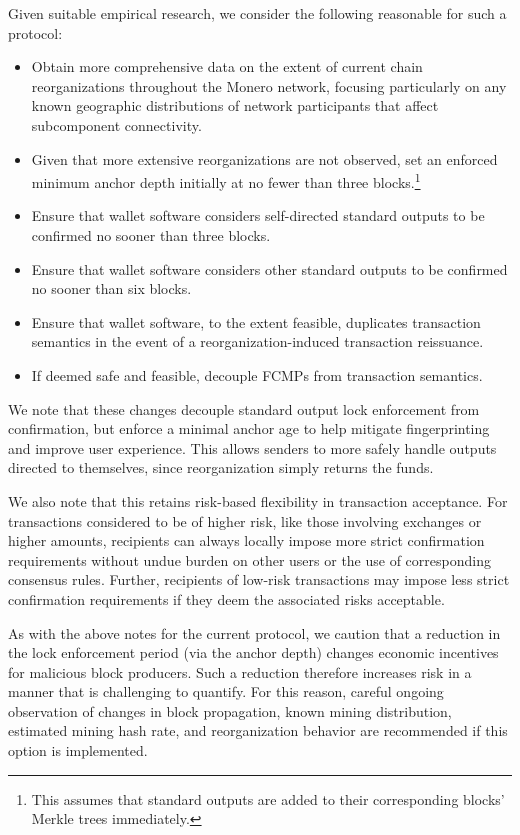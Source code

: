 \documentclass{article}
\theoremstyle{definition}
\begin{document}
Given suitable empirical research, we consider the following reasonable for such a protocol:
\begin{itemize}
\item Obtain more comprehensive data on the extent of current chain reorganizations throughout the Monero network, focusing particularly on any known geographic distributions of network participants that affect subcomponent connectivity.
\item Given that more extensive reorganizations are not observed, set an enforced minimum anchor depth initially at no fewer than three blocks.\footnote{This assumes that standard outputs are added to their corresponding blocks' Merkle trees immediately.}
\item Ensure that wallet software considers self-directed standard outputs to be confirmed no sooner than three blocks.
\item Ensure that wallet software considers other standard outputs to be confirmed no sooner than six blocks.
\item Ensure that wallet software, to the extent feasible, duplicates transaction semantics in the event of a reorganization-induced transaction reissuance.
\item If deemed safe and feasible, decouple FCMPs from transaction semantics.
\end{itemize}

We note that these changes decouple standard output lock enforcement from confirmation, but enforce a minimal anchor age to help mitigate fingerprinting and improve user experience.
This allows senders to more safely handle outputs directed to themselves, since reorganization simply returns the funds.

We also note that this retains risk-based flexibility in transaction acceptance.
For transactions considered to be of higher risk, like those involving exchanges or higher amounts, recipients can always locally impose more strict confirmation requirements without undue burden on other users or the use of corresponding consensus rules.
Further, recipients of low-risk transactions may impose less strict confirmation requirements if they deem the associated risks acceptable.

As with the above notes for the current protocol, we caution that a reduction in the lock enforcement period (via the anchor depth) changes economic incentives for malicious block producers.
Such a reduction therefore increases risk in a manner that is challenging to quantify.
For this reason, careful ongoing observation of changes in block propagation, known mining distribution, estimated mining hash rate, and reorganization behavior are recommended if this option is implemented. 
\end{document}
